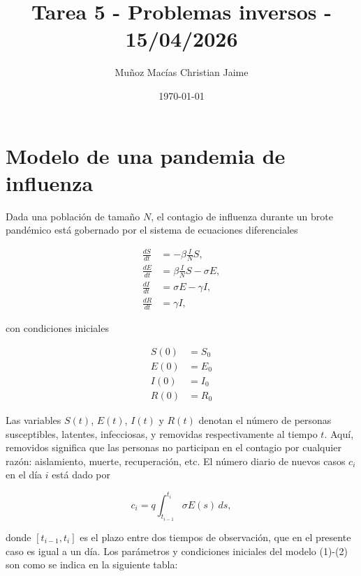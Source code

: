 \documentclass[12pt,spanish,mexico]{article}
\title{Tarea 5 - Problemas inversos - 15/04/2026}
\author{Muñoz Macías Christian Jaime}
\date{\today}
\numberwithin{equation}{section}
\theoremstyle{definition}
\theoremstyle{remark}
\begin{document}
\maketitle


\section*{Modelo de una pandemia de influenza}

Dada una población de tamaño $N$, el contagio de influenza durante un brote pandémico está gobernado por el sistema de ecuaciones diferenciales

\[
\begin{align*}
\frac{dS}{dt} &= -\beta \frac{I}{N} S, \\
\frac{dE}{dt} &= \beta \frac{I}{N} S - \sigma E, \\
\frac{dI}{dt} &= \sigma E - \gamma I, \\
\frac{dR}{dt} &= \gamma I,
\end{align*}
\]

con condiciones iniciales

\[
\begin{align*}
S(0) &= S_0 \\
E(0) &= E_0 \\
I(0) &= I_0 \\
R(0) &= R_0
\end{align*}
\]

Las variables $S(t)$, $E(t)$, $I(t)$ y $R(t)$ denotan el número de personas susceptibles, latentes, infecciosas, y removidas respectivamente al tiempo $t$. Aquí, removidos significa que las personas no participan en el contagio por cualquier razón: aislamiento, muerte, recuperación, etc. El número diario de nuevos casos $c_i$ en el día $i$ está dado por

\[
c_i = q \int_{t_{i-1}}^{t_i} \sigma E(s) \, ds, \tag{3}
\]

donde $[t_{i-1}, t_i]$ es el plazo entre dos tiempos de observación, que en el presente caso es igual a un día. Los parámetros y condiciones iniciales del modelo (1)-(2) son como se indica en la siguiente tabla:
\end{document}
